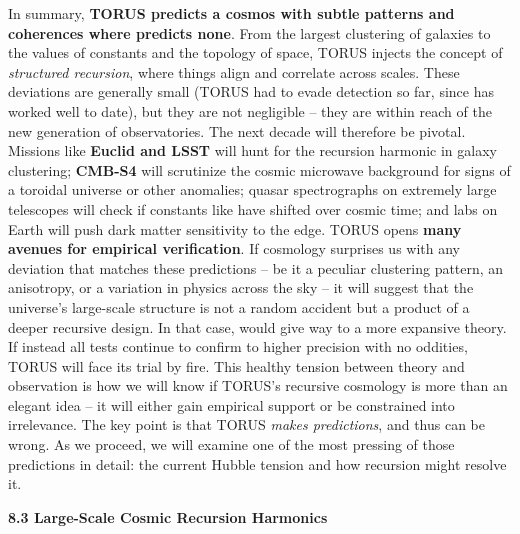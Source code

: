 \documentclass[
]{article}
\begin{document}
{In summary, \textbf{TORUS predicts a cosmos with subtle patterns and
coherences where \LambdaCDM predicts none}. From the largest clustering of
galaxies to the values of constants and the topology of space, TORUS
injects the concept of \emph{structured recursion}, where things align
and correlate across scales. These deviations are generally small (TORUS
had to evade detection so far, since \LambdaCDM has worked well to date), but
they are not negligible -- they are within reach of the new generation
of observatories. The next decade will therefore be pivotal. Missions
like \textbf{Euclid and LSST} will hunt for the recursion harmonic in
galaxy clustering; \textbf{CMB-S4} will scrutinize the cosmic microwave
background for signs of a toroidal universe or other
anomalies\hspace{0pt}; quasar spectrographs on extremely large
telescopes will check if constants like \alpha have shifted over cosmic
time\hspace{0pt}; and labs on Earth will push dark matter sensitivity to
the edge. TORUS opens \textbf{many avenues for empirical
verification}\hspace{0pt}. If cosmology surprises us with any deviation
that matches these predictions -- be it a peculiar clustering pattern,
an anisotropy, or a variation in physics across the sky -- it will
suggest that the universe's large-scale structure is not a random
accident but a product of a deeper recursive design. In that case, \LambdaCDM
would give way to a more expansive theory. If instead all tests continue
to confirm \LambdaCDM to higher precision with no oddities, TORUS will face
its trial by fire. This healthy tension between theory and observation
is how we will know if TORUS's recursive cosmology is more than an
elegant idea -- it will either gain empirical support or be constrained
into irrelevance. The key point is that TORUS \emph{makes predictions},
and thus can be wrong. As we proceed, we will examine one of the most
pressing of those predictions in detail: the current Hubble tension and
how recursion might resolve it.

\textbf{8.3 Large-Scale Cosmic Recursion Harmonics}

}
\end{document}
